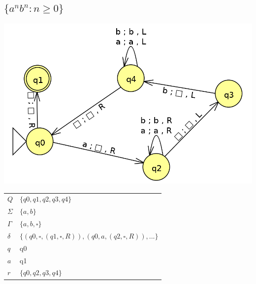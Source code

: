 \documentclass{jhwhw}
\begin{document}
\subsection{$\{a^nb^n:n\ge0\}$}
\begin{center}
\includegraphics[width=\linewidth]{imgs/maquina3.png}
\begin{table}[h]
\begin{tabular}{l|l}
$Q$      & $\{q0,q1,q2,q3,q4\}$\\
$\Sigma$ &  $\{a,b\}$\\
$\Gamma$ &  $\{a,b,\square\}$\\
$\delta$  &  $\{(q0,\square,(q1,\square,R)),(q0,a,(q2,\square,R)),...\}$\\
$q$      & q0 \\
$a$      & q1 \\
$r$      & $\{q0,q2,q3,q4\}$
\end{tabular}
\end{table}
\end{center}
\end{document}

